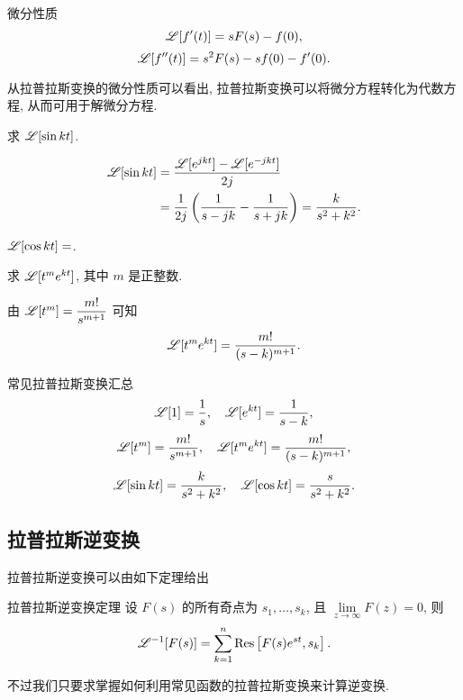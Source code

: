 \begin{theorem}{微分性质}
	\[\mathscr{L}[f'(t)]=sF(s)-f(0),\]
	\[\mathscr{L}[f''(t)]=s^2F(s)-sf(0)-f'(0).\]
\end{theorem}

从拉普拉斯变换的微分性质可以看出, 拉普拉斯变换可以将微分方程转化为代数方程, 从而可用于解微分方程.

\begin{example}
	求 $\mathscr{L}[\sin{kt}]$.
\end{example}

\begin{solution}
	\begin{align*}
		\mathscr{L}[\sin{kt}]&=\frac{\mathscr{L}[e^{jkt}]-\mathscr{L}[e^{-jkt}]}{2j}\\
		&=\frac1{2j}\left(\frac1{s-jk}-\frac1{s+jk}\right)
			=\frac k{s^2+k^2}.
	\end{align*}
\end{solution}

\begin{exercise}
	$\mathscr{L}[\cos{kt}]=$.
\end{exercise}

\begin{example}
	求 $\mathscr{L}[t^me^{kt}]$, 其中 $m$ 是正整数.
\end{example}

\begin{solution}
	由 $\mathscr{L}[t^m]=\dfrac{m!}{s^{m+1}}$ 可知
	\[\mathscr{L}[t^me^{kt}]=\frac{m!}{(s-k)^{m+1}}.\]
\end{solution}

\begin{theorem}{常见拉普拉斯变换汇总}
	\[\mathscr{L}[1]=\frac1s,\quad \mathscr{L}[e^{kt}]=\frac1{s-k},\]
	\[\mathscr{L}[t^m]=\frac{m!}{s^{m+1}},\quad \mathscr{L}[t^me^{kt}]=\frac{m!}{(s-k)^{m+1}},\]
	\[\mathscr{L}[\sin kt]=\frac{k}{s^2+k^2},\quad
	\mathscr{L}[\cos kt]=\frac{s}{s^2+k^2}.\]
\end{theorem}

\subsection{拉普拉斯逆变换}

拉普拉斯逆变换可以由如下定理给出
\begin{theorem}{拉普拉斯逆变换定理}
	设 $F(s)$ 的所有奇点为 $s_1,\dots,s_k$, 且 $\lim\limits_{z\to\infty}F(z)=0$, 则
	\[\mathscr{L}^{-1}[F(s)]=\sum_{k=1}^n {\mathrm{Res}}\left[F(s)e^{st},s_k\right].\]
\end{theorem}

不过我们只要求掌握如何利用常见函数的拉普拉斯变换来计算逆变换.

